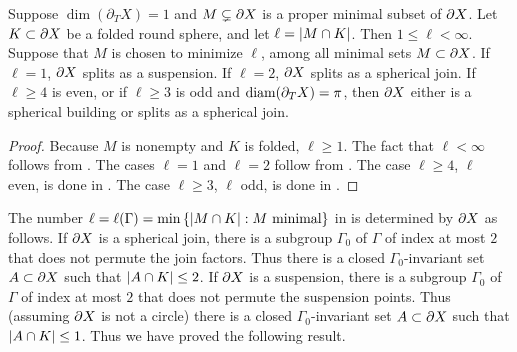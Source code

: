 \documentclass{amsart}
\renewcommand{\setp}[2]{\left\{#1 : #2\right\}}
\newcommand{\bdT}{\partial_T}
\begin{document}
\begin{theorem}[\thmref{MT}]	\label{main theorem}
Suppose $\dim(\bdT X) = 1$ and $M \subsetneq \partial X$ is a proper minimal subset of $\partial X$.  Let $K \subset \partial X$ be a folded round sphere, and let $\ell = \left| M \cap K \right|$.  Then $1 \le \ell < \infty$.  Suppose that $M$ is chosen to minimize $\ell$, among all minimal sets $M \subset \partial X$.  If $\ell = 1$, $\partial X$ splits as a suspension.  If $\ell = 2$, $\partial X$ splits as a spherical join.  If $\ell \ge 4$ is even, or if $\ell \ge 3$ is odd and $\diam (\bdT X) = \pi$, then $\partial X$ either is a spherical building or splits as a spherical join. \end{theorem}

\begin{proof}
Because $M$ is nonempty and $K$ is folded, $\ell \ge 1$.
The fact that $\ell < \infty$ follows from .
The cases $\ell = 1$ and $\ell = 2$ follow from .
The case $\ell \ge 4$, $\ell$ even, is done in .
The case $\ell \ge 3$, $\ell$ odd, is done in .
\end{proof}

The number $\ell = \ell(\Gamma) = \min \setp{\abs{M \cap K}}{M \text{ minimal}}$ in  is determined by $\partial X$ as follows.
If $\partial X$ is a spherical join, there is a subgroup $\Gamma_0$ of $\Gamma$ of index at most $2$ that does not permute the join factors.  Thus there is a closed $\Gamma_0$-invariant set $A \subset \partial X$ such that $\left| A \cap K \right| \le 2$.
If $\partial X$ is a suspension, there is a subgroup $\Gamma_0$ of $\Gamma$ of index at most $2$ that does not permute the suspension points.  Thus (assuming $\partial X$ is not a circle) there is a closed $\Gamma_0$-invariant set $A \subset \partial X$ such that $\left| A \cap K \right| \le 1$.
Thus we have proved the following result.
\end{document}
